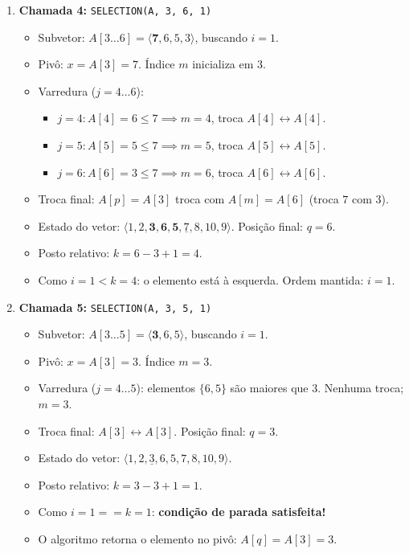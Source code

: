 \documentclass[11pt,a4paper]{article}
\begin{document}
\begin{enumerate}
    \item \textbf{Chamada 4:} \texttt{SELECTION(A, 3, 6, 1)}
    \begin{itemize}
        \item Subvetor: $A[3 \dots 6] = \langle \mathbf{7}, 6, 5, 3 \rangle$, buscando $i = 1$.
        \item Pivô: $x = A[3] = 7$. Índice $m$ inicializa em $3$.
        \item Varredura ($j = 4 \dots 6$):
        \begin{itemize}
            \item $j=4: A[4]=6 \le 7 \implies m=4$, troca $A[4] \leftrightarrow A[4]$.
            \item $j=5: A[5]=5 \le 7 \implies m=5$, troca $A[5] \leftrightarrow A[5]$.
            \item $j=6: A[6]=3 \le 7 \implies m=6$, troca $A[6] \leftrightarrow A[6]$.
        \end{itemize}
        \item Troca final: $A[p]=A[3]$ troca com $A[m]=A[6]$ (troca $7$ com $3$).
        \item Estado do vetor: $\langle 1, 2, \mathbf{3, 6, 5}, \underline{7}, 8, 10, 9 \rangle$. Posição final: $q = 6$.
        \item Posto relativo: $k = 6 - 3 + 1 = 4$.
        \item Como $i = 1 < k = 4$: o elemento está à esquerda. Ordem mantida: $i = 1$.
    \end{itemize}

    \item \textbf{Chamada 5:} \texttt{SELECTION(A, 3, 5, 1)}
    \begin{itemize}
        \item Subvetor: $A[3 \dots 5] = \langle \mathbf{3}, 6, 5 \rangle$, buscando $i = 1$.
        \item Pivô: $x = A[3] = 3$. Índice $m = 3$.
        \item Varredura ($j = 4 \dots 5$): elementos $\{6, 5\}$ são maiores que $3$. Nenhuma troca; $m = 3$.
        \item Troca final: $A[3] \leftrightarrow A[3]$. Posição final: $q = 3$.
        \item Estado do vetor: $\langle 1, 2, \underline{3}, 6, 5, 7, 8, 10, 9 \rangle$.
        \item Posto relativo: $k = 3 - 3 + 1 = 1$.
        \item Como $i = 1 == k = 1$: \textbf{condição de parada satisfeita!}
        \item O algoritmo retorna o elemento no pivô: $A[q] = A[3] = 3$.
    \end{itemize}
\end{enumerate}
\end{document}

